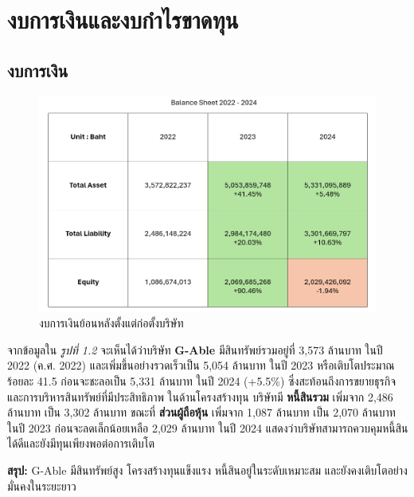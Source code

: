 \clearpage

\section{งบการเงินและงบกำไรขาดทุน}
\subsection{งบการเงิน}
\begin{figure}[ht]
    \begin{center}
        \includegraphics[scale=0.4]{images/balance.png}
    \end{center}
    \caption[งบการเงินย้อนหลังตั้งแต่ก่อตั้งบริษัท]{งบการเงินย้อนหลังตั้งแต่ก่อตั้งบริษัท}
\end{figure}
จากข้อมูลใน \textit{รูปที่ 1.2} จะเห็นได้ว่าบริษัท \textbf{G-Able} มีสินทรัพย์รวมอยู่ที่ 3,573 ล้านบาท ในปี 2022 (ค.ศ. 2022) และเพิ่มขึ้นอย่างรวดเร็วเป็น 5,054 ล้านบาท ในปี 2023 หรือเติบโตประมาณร้อยละ 41.5 ก่อนจะชะลอเป็น 5,331 ล้านบาท ในปี 2024 (+5.5\%) ซึ่งสะท้อนถึงการขยายธุรกิจและการบริหารสินทรัพย์ที่มีประสิทธิภาพ
ในด้านโครงสร้างทุน บริษัทมี \textbf{หนี้สินรวม} เพิ่มจาก 2,486 ล้านบาท เป็น 3,302 ล้านบาท ขณะที่ \textbf{ส่วนผู้ถือหุ้น} เพิ่มจาก 1,087 ล้านบาท เป็น 2,070 ล้านบาท ในปี 2023 ก่อนจะลดเล็กน้อยเหลือ 2,029 ล้านบาท ในปี 2024 แสดงว่าบริษัทสามารถควบคุมหนี้สินได้ดีและยังมีทุนเพียงพอต่อการเติบโต

\textbf{สรุป:} G-Able มีสินทรัพย์สูง โครงสร้างทุนแข็งแรง หนี้สินอยู่ในระดับเหมาะสม และยังคงเติบโตอย่างมั่นคงในระยะยาว

\clearpage


